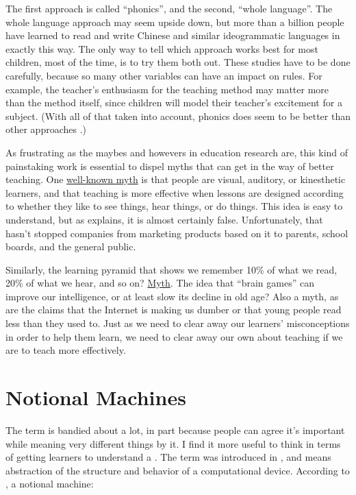The first approach is called ``phonics'', and the second, ``whole
language''. The whole language approach may seem upside down, but more
than a billion people have learned to read and write Chinese and similar
ideogrammatic languages in exactly this way. The only way to tell which
approach works best for most children, most of the time, is to try them
both out. These studies have to be done carefully, because so many other
variables can have an impact on rules. For example, the teacher's
enthusiasm for the teaching method may matter more than the method
itself, since children will model their teacher's excitement for a
subject. (With all of that taken into account, phonics does seem to be
better than other approaches \cite{Foor1998}.)

As frustrating as the maybes and howevers in education research are,
this kind of painstaking work is essential to dispel myths that can
get in the way of better teaching. One \href{https://en.wikipedia.org/wiki/Learning\_styles\#Learning\_modalities}{well-known
myth} is that people are visual, auditory, or
kinesthetic learners, and that teaching is more effective when lessons
are designed according to whether they like to see things, hear
things, or do things. This idea is easy to understand, but as
\cite{DeBr2015} explains, it is almost certainly
false. Unfortunately, that hasn't stopped companies from marketing
products based on it to parents, school boards, and the general
public.

Similarly, the learning pyramid that shows we remember 10\% of what we
read, 20\% of what we hear, and so on? \href{https://www.worklearning.com/2015/01/05/mythical-retention-data-the-corrupted-cone/}{Myth}. The
idea that ``brain games'' can improve our intelligence, or at least slow
its decline in old age? Also a myth, as are the claims that the
Internet is making us dumber or that young people read less than they
used to. Just as we need to clear away our learners' misconceptions in
order to help them learn, we need to clear away our own about teaching
if we are to teach more effectively.

\section{Notional Machines}\label{notional-machines}

The term  is
bandied about a lot, in part because people can agree it's important
while meaning very different things by it. I find it more useful to
think in terms of getting learners to understand a . The term was introduced in
\cite{DuBo1986}, and means abstraction of the structure and
behavior of a computational device. According to \cite{Sorv2013},
a notional machine:

